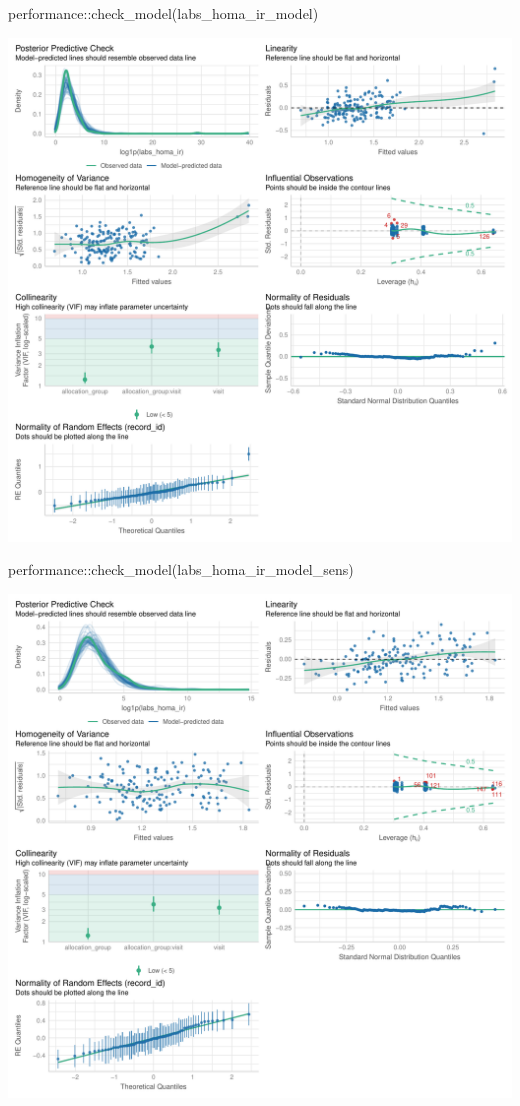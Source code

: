 \documentclass[
  12pt,
]{article}
\newenvironment{Shaded}{\begin{snugshade}}{\end{snugshade}}
\newcommand{\FunctionTok}[1]{\textcolor[rgb]{0.28,0.35,0.67}{#1}}
\newcommand{\NormalTok}[1]{\textcolor[rgb]{0.00,0.23,0.31}{#1}}
\newcommand{\SpecialCharTok}[1]{\textcolor[rgb]{0.37,0.37,0.37}{#1}}
\begin{document}
\begin{Shaded}
\begin{Highlighting}[]
\NormalTok{performance}\SpecialCharTok{::}\FunctionTok{check\_model}\NormalTok{(labs\_homa\_ir\_model)}
\end{Highlighting}
\end{Shaded}

\includegraphics{Outcomes_files/figure-pdf/labs_homa_ir_4-1.pdf}

\begin{Shaded}
\begin{Highlighting}[]
\NormalTok{performance}\SpecialCharTok{::}\FunctionTok{check\_model}\NormalTok{(labs\_homa\_ir\_model\_sens)}
\end{Highlighting}
\end{Shaded}

\includegraphics{Outcomes_files/figure-pdf/labs_homa_ir_4-2.pdf}
\end{document}
